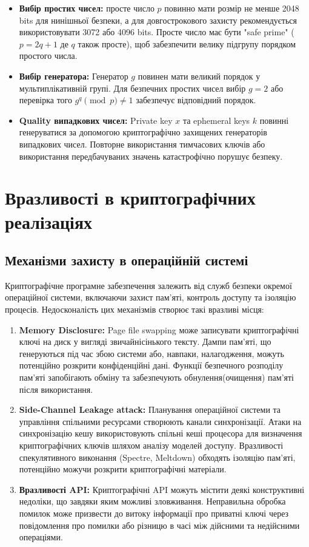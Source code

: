 \begin{itemize}
    \item \textbf{Вибір простих чисел:} просте число $p$ повинно мати розмір не менше 2048 bits для нинішньої безпеки, 
        а для довгострокового захисту рекомендується використовувати 3072 або 4096 bits. Просте число має бути 
        "safe prime"{} ($p = 2q + 1$ де $q$ також просте), щоб забезпечити велику підгрупу порядком простого числа.
    \item \textbf{Вибір генератора:} Генератор $g$ повинен мати великий порядок у мультиплікативній групі. Для 
        безпечних простих чисел вибір $g = 2$ або перевірка того $g^{q} \pmod p \neq 1$ забезпечує відповідний порядок.
    \item \textbf{Quality випадкових чисел:} Private key $x$ та ephemeral keys $k$ повинні генеруватися за допомогою 
        криптографічно захищених генераторів випадкових чисел. Повторне використання тимчасових ключів або використання 
        передбачуваних значень катастрофічно порушує безпеку.
\end{itemize}

\section{Вразливості в криптографічних реалізаціях}

\subsection{Механізми захисту в операційній системі}

Криптографічне програмне забезпечення залежить від служб безпеки окремої операційної системи, включаючи захист пам'яті, 
контроль доступу та ізоляцію процесів. Недосконалість цих механізмів створює такі вразливі місця:
\begin{enumerate}
    \item \textbf{Memory Disclosure:} Page file swapping може записувати криптографічні ключі на диск у вигляді
        звичайнісінького тексту. Дампи пам'яті, що генеруються під час збою системи або, навпаки, налагодження, можуть 
        потенційно розкрити конфіденційні дані. Функції безпечного розподілу пам'яті запобігають обміну та забезпечують 
        обнулення(очищення) пам'яті після використання.
    \item \textbf{Side-Channel Leakage attack:} Планування операційної системи та управління спільними ресурсами створюють
        канали синхронізації. Атаки на синхронізацію кешу використовують спільні кеші процесора для визначення криптографічних 
        ключів шляхом аналізу моделей доступу. Вразливості спекулятивного виконання (Spectre, Meltdown) обходять ізоляцію 
        пам'яті, потенційно можучи розкрити криптографічні матеріали.
    \item \textbf{Вразливості API:} Криптографічні API можуть містити деякі конструктивні недоліки, що завдяки яким 
        можливі зловживання. Неправильна обробка помилок може призвести до витоку інформації про приватні ключі через 
        повідомлення про помилки або різницю в часі між дійсними та недійсними операціями.
\end{enumerate}

